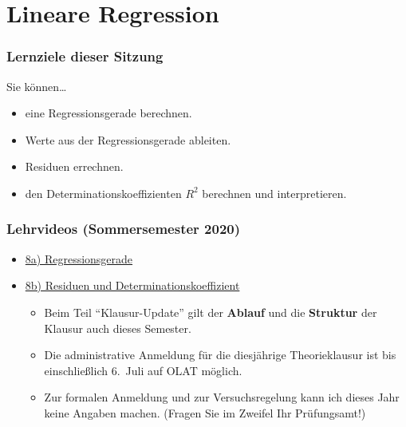 \documentclass[
  11pt,
  ngerman,
  a4paper,
]{report}
\providecommand{\tightlist}{%
  \setlength{\itemsep}{0pt}\setlength{\parskip}{0pt}}
\begin{document}
\hypertarget{lineare-regression}{%
\chapter{Lineare Regression}\label{lineare-regression}}

\hypertarget{lernziele-dieser-sitzung-7}{%
\subsection*{Lernziele dieser Sitzung}\label{lernziele-dieser-sitzung-7}}

Sie können\ldots{}

\begin{itemize}
\tightlist
\item
  eine Regressionsgerade berechnen.
\item
  Werte aus der Regressionsgerade ableiten.
\item
  Residuen errechnen.
\item
  den Determinationskoeffizienten \(R^2\) berechnen und interpretieren.
\end{itemize}

\hypertarget{lehrvideos-sommersemester-2020-4}{%
\subsection*{Lehrvideos (Sommersemester 2020)}\label{lehrvideos-sommersemester-2020-4}}

\begin{itemize}
\tightlist
\item
  \href{https://video01.uni-frankfurt.de/Mediasite/Play/420909b80f8b467eb43ec85108200d2a1d}{8a) Regressionsgerade}
\item
  \href{https://video01.uni-frankfurt.de/Mediasite/Play/d6a9160c2ba0402fa64395cbdf5d25531d}{8b) Residuen und Determinationskoeffizient}

  \begin{itemize}
  \tightlist
  \item
    Beim Teil \enquote{Klausur-Update} gilt der \textbf{Ablauf} und die \textbf{Struktur} der Klausur auch dieses Semester.
  \item
    Die administrative Anmeldung für die diesjährige Theorieklausur ist bis einschließlich 6.~Juli auf OLAT möglich.
  \item
    Zur formalen Anmeldung und zur Versuchsregelung kann ich dieses Jahr keine Angaben machen. (Fragen Sie im Zweifel Ihr Prüfungsamt!)
  \end{itemize}
\end{itemize}
\end{document}
